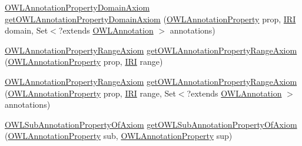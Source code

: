 \begin{DoxyCompactItemize}
\item 
\hyperlink{interfaceorg_1_1semanticweb_1_1owlapi_1_1model_1_1_o_w_l_annotation_property_domain_axiom}{O\-W\-L\-Annotation\-Property\-Domain\-Axiom} \hyperlink{interfaceorg_1_1semanticweb_1_1owlapi_1_1model_1_1_o_w_l_data_factory_a07e4ca0fe5ea620018131b9aff1314f7}{get\-O\-W\-L\-Annotation\-Property\-Domain\-Axiom} (\hyperlink{interfaceorg_1_1semanticweb_1_1owlapi_1_1model_1_1_o_w_l_annotation_property}{O\-W\-L\-Annotation\-Property} prop, \hyperlink{classorg_1_1semanticweb_1_1owlapi_1_1model_1_1_i_r_i}{I\-R\-I} domain, Set$<$?extends \hyperlink{interfaceorg_1_1semanticweb_1_1owlapi_1_1model_1_1_o_w_l_annotation}{O\-W\-L\-Annotation} $>$ annotations)
\item 
\hyperlink{interfaceorg_1_1semanticweb_1_1owlapi_1_1model_1_1_o_w_l_annotation_property_range_axiom}{O\-W\-L\-Annotation\-Property\-Range\-Axiom} \hyperlink{interfaceorg_1_1semanticweb_1_1owlapi_1_1model_1_1_o_w_l_data_factory_a40097c5a973724fe6d189ae2bb19adb1}{get\-O\-W\-L\-Annotation\-Property\-Range\-Axiom} (\hyperlink{interfaceorg_1_1semanticweb_1_1owlapi_1_1model_1_1_o_w_l_annotation_property}{O\-W\-L\-Annotation\-Property} prop, \hyperlink{classorg_1_1semanticweb_1_1owlapi_1_1model_1_1_i_r_i}{I\-R\-I} range)
\item 
\hyperlink{interfaceorg_1_1semanticweb_1_1owlapi_1_1model_1_1_o_w_l_annotation_property_range_axiom}{O\-W\-L\-Annotation\-Property\-Range\-Axiom} \hyperlink{interfaceorg_1_1semanticweb_1_1owlapi_1_1model_1_1_o_w_l_data_factory_a3f229b3f44f00ecbc054ac2a9716857c}{get\-O\-W\-L\-Annotation\-Property\-Range\-Axiom} (\hyperlink{interfaceorg_1_1semanticweb_1_1owlapi_1_1model_1_1_o_w_l_annotation_property}{O\-W\-L\-Annotation\-Property} prop, \hyperlink{classorg_1_1semanticweb_1_1owlapi_1_1model_1_1_i_r_i}{I\-R\-I} range, Set$<$?extends \hyperlink{interfaceorg_1_1semanticweb_1_1owlapi_1_1model_1_1_o_w_l_annotation}{O\-W\-L\-Annotation} $>$ annotations)
\item 
\hyperlink{interfaceorg_1_1semanticweb_1_1owlapi_1_1model_1_1_o_w_l_sub_annotation_property_of_axiom}{O\-W\-L\-Sub\-Annotation\-Property\-Of\-Axiom} \hyperlink{interfaceorg_1_1semanticweb_1_1owlapi_1_1model_1_1_o_w_l_data_factory_ad280b210225f92f7a189c6e48138f715}{get\-O\-W\-L\-Sub\-Annotation\-Property\-Of\-Axiom} (\hyperlink{interfaceorg_1_1semanticweb_1_1owlapi_1_1model_1_1_o_w_l_annotation_property}{O\-W\-L\-Annotation\-Property} sub, \hyperlink{interfaceorg_1_1semanticweb_1_1owlapi_1_1model_1_1_o_w_l_annotation_property}{O\-W\-L\-Annotation\-Property} sup)
\item 

\end{DoxyCompactItemize}
